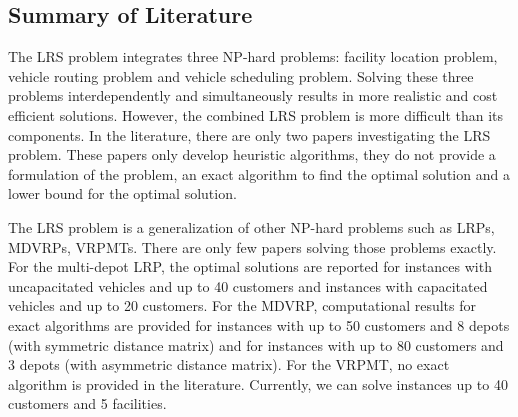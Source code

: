 
\subsection{Summary of Literature}

The LRS problem integrates three NP-hard problems: facility location problem, 
vehicle routing problem and vehicle scheduling problem. Solving these three
problems interdependently and simultaneously results in more realistic 
and cost efficient solutions. However, the combined LRS problem is more difficult 
than its components. In the literature, there are only two papers investigating the
LRS problem. These papers only develop heuristic algorithms, they do not provide
a formulation of the problem, an exact algorithm to find the optimal solution and  
a lower bound for the optimal solution.

The LRS problem is a generalization of other NP-hard problems such as LRPs, MDVRPs, VRPMTs. 
There are only few papers solving those problems exactly. For the multi-depot
LRP, the optimal solutions are reported for instances with uncapacitated vehicles and up to 
40 customers and instances with capacitated vehicles and up to 20 customers. For the MDVRP, 
computational results for exact algorithms are provided for instances with up to 50
customers and 8 depots (with symmetric distance matrix) and  for instances with up to 80
customers and 3 depots (with asymmetric distance matrix). For the VRPMT, no exact algorithm
is provided in the literature. Currently, we can solve instances up to 40 customers and 5 facilities.

